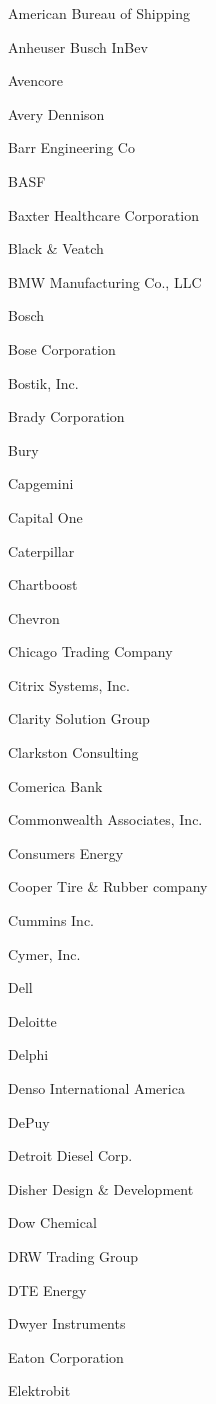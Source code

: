 \documentclass[twoside]{article}
\begin{document}
\begin{center}
\begin{multicols}{5}
\begin{FlushLeft}
\begin{compactitem}
\item American Bureau of Shipping
\item Anheuser Busch InBev
\item Avencore
\item Avery Dennison
\item Barr Engineering Co
\item BASF
\item Baxter Healthcare Corporation
\item Black \& Veatch
\item BMW Manufacturing Co., LLC
\item Bosch
\item Bose Corporation
\item Bostik, Inc.
\item Brady Corporation
\item Bury
\item Capgemini
\item Capital One
\item Caterpillar
\item Chartboost
\item Chevron
\item Chicago Trading Company
\item Citrix Systems, Inc.
\item Clarity Solution Group
\item Clarkston Consulting
\item Comerica Bank
\item Commonwealth Associates, Inc.
\item Consumers Energy
\item Cooper Tire \& Rubber company
\item Cummins Inc.
\item Cymer, Inc.
\item Dell
\item Deloitte
\item Delphi
\item Denso International America
\item DePuy
\item Detroit Diesel Corp.
\item Disher Design \& Development
\item Dow Chemical
\item DRW Trading Group
\item DTE Energy
\item Dwyer Instruments
\item Eaton Corporation
\item Elektrobit

\end{compactitem}
\end{FlushLeft}
\end{multicols}
\end{center}
\end{document}
